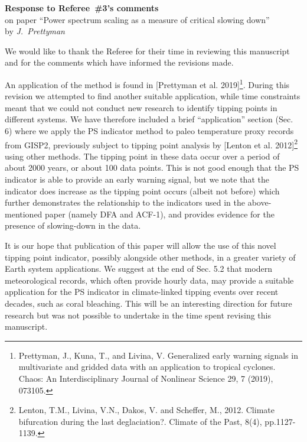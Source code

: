 \documentclass[12pt, a4paper]{article}
\begin{document}
\begin{center}
{\bf Response to Referee~\#3's comments}\\
on paper ``Power spectrum scaling as a measure of critical slowing down''\\[5pt]
by {\it J.~Prettyman}
\end{center}

\vspace{3mm}

\noindent We would like to thank the Referee for their time in reviewing this manuscript and for the comments which have informed the revisions made. 

An application of the method is found in [Prettyman et al. 2019]\footnote{Prettyman, J., Kuna, T., and Livina, V. Generalized early warning signals in multivariate and gridded data with an application to tropical cyclones. Chaos: An Interdisciplinary Journal of Nonlinear Science 29, 7 (2019), 073105.}. During this revision we attempted to find another suitable application, while time constraints meant that we could not conduct new research to identify tipping points in different systems. We have therefore included a brief “application” section (Sec. 6) where we apply the PS indicator method to paleo temperature proxy records from GISP2, previously subject to tipping point analysis by [Lenton et al. 2012]\footnote{‌Lenton, T.M., Livina, V.N., Dakos, V. and Scheffer, M., 2012. Climate bifurcation during the last deglaciation?. Climate of the Past, 8(4), pp.1127-1139.} using other methods. The tipping point in these data occur over a period of about 2000 years, or about 100 data points. This is not good enough that the PS indicator is able to provide an early warning signal, but we note that the indicator does increase as the tipping point occurs (albeit not before) which further demonstrates the relationship to the indicators used in the above-mentioned paper (namely DFA and ACF-1), and provides evidence for the presence of slowing-down in the data.

It is our hope that publication of this paper will allow the use of this novel tipping point indicator, possibly alongside other methods, in a greater variety of Earth system applications. We suggest at the end of Sec. 5.2 that modern meteorological records, which often provide hourly data, may provide a suitable application for the PS indicator in climate-linked tipping events over recent decades, such as coral bleaching. This will be an interesting direction for future research but was not possible to undertake in the time spent revising this manuscript. 
\end{document}
